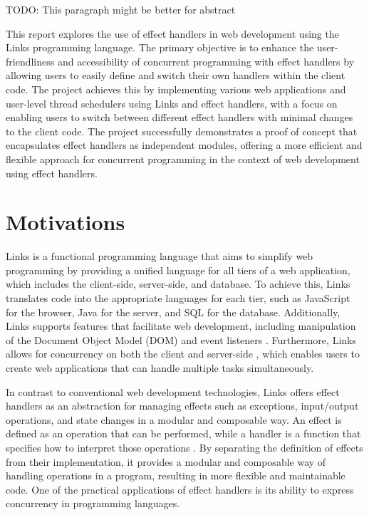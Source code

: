 \documentclass[logo,bsc,singlespacing,parskip]{infthesis}
\begin{document}
TODO: This paragraph might be better for abstract

This report explores the use of effect handlers in web development using the Links programming language. The primary objective is to enhance the user-friendliness and accessibility of concurrent programming with effect handlers by allowing users to easily define and switch their own handlers within the client code. The project achieves this by implementing various web applications and user-level thread schedulers using Links and effect handlers, with a focus on enabling users to switch between different effect handlers with minimal changes to the client code. The project successfully demonstrates a proof of concept that encapsulates effect handlers as independent modules, offering a more efficient and flexible approach for concurrent programming in the context of web development using effect handlers.

\section{Motivations}

Links \cite{links_website} is a functional programming language that aims to simplify web programming by providing a unified language for all tiers of a web application, which includes the client-side, server-side, and database. To achieve this, Links translates code into the appropriate languages for each tier, such as JavaScript for the browser, Java for the server, and SQL for the database. Additionally, Links supports features that facilitate web development, including manipulation of the Document Object Model (DOM) and event listeners \cite{links}. Furthermore, Links allows for concurrency on both the client and server-side \cite{links}, which enables users to create web applications that can handle multiple tasks simultaneously.

In contrast to conventional web development technologies, Links offers effect handlers \cite{daniel_effect_links} as an abstraction for managing effects such as exceptions, input/output operations, and state changes in a modular and composable way. An effect is defined as an operation that can be performed, while a handler is a function that specifies how to interpret those operations \cite{daniel_effect_links}. By separating the definition of effects from their implementation, it provides a modular and composable way of handling operations in a program, resulting in more flexible and maintainable code. One of the practical applications of effect handlers is its ability to express concurrency in programming languages.
\end{document}
